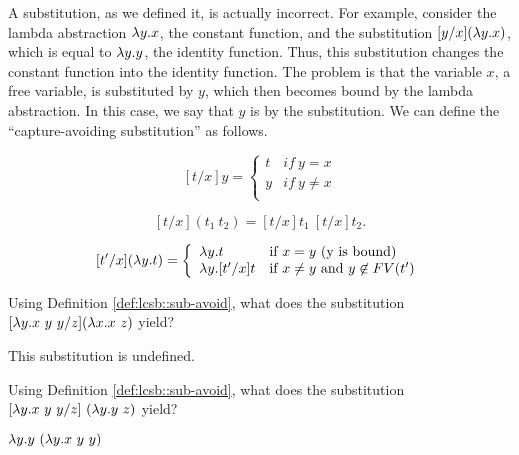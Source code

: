\begin{gram}[Capture]
\label{grm:lcsb::capture}
A substitution, as we defined it, is actually incorrect.  
%
For example, consider the lambda abstraction $\lambda y.x$, the constant
function, and the substitution $[y/x](\lambda y.x)$, which is equal to $\lambda
y.y$, the identity function.
%
Thus, this substitution changes the constant function into the
identity function.
%
The problem is that the variable $x$, a free
variable, is substituted by $y$, which then becomes bound by the
lambda abstraction.  In this case, we say that $y$ is 
by the substitution.
%
We can define the ``capture-avoiding substitution'' as follows. 
\end{gram}


\begin{definition}
\label{def:lcsb::sub-avoid}
\[
[t/x]y = \left\{ \begin{array}{ll}
        t & if~y = x \\
        y & if~y\neq x \\
        \end{array} \right.
\]


\[
[t/x](t_1~t_2) = [t/x]t_1~[t/x]t_2.
 \]

\[
[t'/x](\lambda y.t) = 
\left\{ \begin{array}{ll}

\lambda y.t &\mbox{if}~ x = y \mbox{ (y is bound)} \\

\lambda y.[t'/x]t &\mbox{if}~ x \neq y \mbox { and } y \not \in FV(t') \\

\end{array} \right. 
\]
\end{definition}

\begin{flex}
\begin{exercise}
\label{xrcs:lcsb::sub-undef}
Using Definition \ref{def:lcsb::sub-avoid},
%
what does the substitution $[\lambda y.x~y~y/z](\lambda x.x~z)$ yield?
\end{exercise}
\begin{solution}
\label{sol:lcsb::sub-basic}
This substitution is undefined.
\end{solution}
\end{flex}

\begin{flex}
\begin{exercise}
\label{xrcs:lcsb::sub-rename}
Using Definition \ref{def:lcsb::sub-avoid},
what does the substitution  $[\lambda y.x~y~y/z]~(\lambda y.y~z)$ yield?
\end{exercise}
\begin{solution}
$\lambda y.y~(\lambda y.x~y~y)$
\end{solution}
\end{flex}


